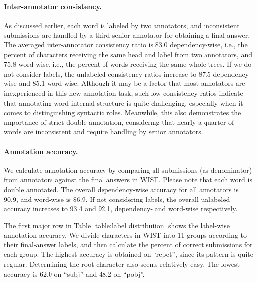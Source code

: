 \paragraph{Inter-annotator consistency.}  
As discussed earlier, 
each word is labeled by two annotators, and inconsistent submissions are handled by a third senior annotator for obtaining a final answer. 
The averaged inter-annotator consistency ratio is 83.0 dependency-wise, i.e., the percent of characters receiving the same head and label from two annotators, and 75.8 word-wise, i.e., the percent of words receiving the same whole trees. 
If we do not consider labels, the unlabeled consistency ratios increase to 87.5 dependency-wise and 85.1 word-wise. 
Although it may be a factor that most annotators are inexperienced in this new annotation task, 
such low consistency ratios indicate that annotating word-internal structure is quite challenging, especially when it comes to distinguishing syntactic roles. 
Meanwhile, this also demonstrates the importance of strict
double annotation, considering that nearly a quarter of words are inconsistent and require handling by senior annotators.  


\paragraph{Annotation accuracy.}

We calculate annotation accuracy by comparing all submissions (as denominator) from annotators against the final answers in WIST. 
Please note that each word is double annotated. 
The overall dependency-wise accuracy for all annotators is 90.9, and word-wise is 86.9. 
If not considering labels, the overall unlabeled accuracy increases to 93.4 and 92.1, dependency- and word-wise respectively. 

The first major row in Table \ref{table:label distribution} shows the label-wise annotation accuracy. 
We divide characters in WIST into 11 groups according to their final-answer labels, and then  calculate the percent of correct submissions for each group. 
The highest accuracy %
is obtained on ``repet'', since its pattern is quite regular. 
Determining the root character also seems relatively easy. 
The lowest accuracy is 62.0 on ``subj'' and 48.2 on ``pobj''.


